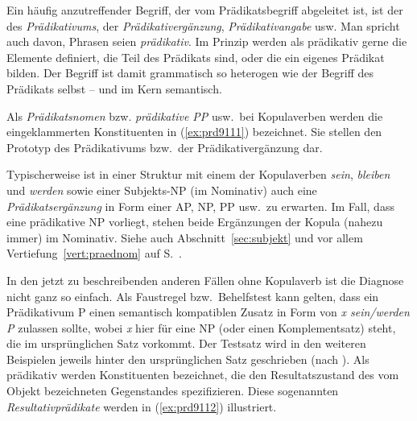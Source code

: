 Ein häufig anzutreffender Begriff, der vom Prädikatsbegriff abgeleitet ist, ist der des \textit{Prädikativums}, der \textit{Prädikativergänzung}, \textit{Prädikativangabe} usw.
Man spricht auch davon, Phrasen seien \textit{prädikativ}.
Im Prinzip werden als prädikativ gerne die Elemente definiert, die Teil des Prädikats sind, oder die ein eigenes Prädikat bilden.
Der Begriff ist damit grammatisch so heterogen wie der Begriff des Prädikats selbst -- und im Kern semantisch.


Als \textit{Prädikatsnomen} bzw. \textit{prädikative PP} usw.\ bei Kopulaverben werden die eingeklammerten Konstituenten in (\ref{ex:prd9111}) bezeichnet.
Sie stellen den Prototyp des Prädikativums bzw.\ der Prädikativergänzung dar.


\begin{exe}
  \ex\label{ex:prd9111} 
  \begin{xlist}
  \end{xlist}
\end{exe}

Typischerweise ist in einer Struktur mit einem der Kopulaverben \textit{sein}, \textit{bleiben} und \textit{werden} sowie einer Subjekts-NP (im Nominativ) auch eine \textit{Prädikatsergänzung} in Form einer AP, NP, PP usw.\ zu erwarten.
Im Fall, dass eine prädikative NP vorliegt, stehen beide Ergänzungen der Kopula (nahezu immer) im Nominativ.
Siehe auch Abschnitt~\ref{sec:subjekt} und vor allem Vertiefung~\ref{vert:praednom} auf S.~\pageref{vert:praednom}.

In den jetzt zu beschreibenden anderen Fällen ohne Kopulaverb ist die Diagnose nicht ganz so einfach.
Als Faustregel bzw.\ Behelfstest kann gelten, dass ein Prädikativum P einen semantisch kompatiblen Zusatz in Form von \textit{x sein/werden P} zulassen sollte, wobei \textit{x} hier für eine NP (oder einen Komplementsatz) steht, die im ursprünglichen Satz vorkommt.
Der Testsatz wird in den weiteren Beispielen jeweils hinter den ursprünglichen Satz geschrieben (nach \Folgt).
Als prädikativ werden \zB Konstituenten bezeichnet, die den Resultatszustand des vom Objekt bezeichneten Gegenstandes spezifizieren.
Diese sogenannten \textit{Resultativprädikate} werden in (\ref{ex:prd9112}) illustriert.

